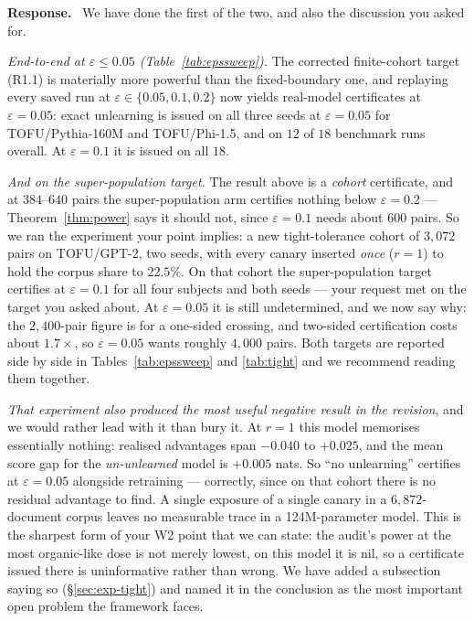 \documentclass[11pt,a4paper]{article}
\newcommand{\eps}{\varepsilon}
\newenvironment{reply}{%
  \par\smallskip\noindent\textbf{\color{acol}Response.}\ \begingroup}{\endgroup\par}
\begin{document}
\begin{reply}
We have done the first of the two, and also the discussion you asked for.

\emph{End-to-end at $\eps \le 0.05$ (Table~\ref{tab:epssweep}).} The corrected finite-cohort target
(R1.1) is materially more powerful than the fixed-boundary one, and replaying every
saved run at $\eps \in \{0.05, 0.1, 0.2\}$ now yields real-model certificates at
$\eps = 0.05$: exact unlearning is issued on all three seeds at $\eps=0.05$ for
TOFU/Pythia-160M and TOFU/Phi-1.5, and on $12$ of $18$ benchmark runs overall. At
$\eps = 0.1$ it is issued on all $18$.

\emph{And on the super-population target.} The result above is a \emph{cohort}
certificate, and at $384$--$640$ pairs the super-population arm certifies nothing below
$\eps = 0.2$ --- Theorem~\ref{thm:power} says it should not, since $\eps = 0.1$ needs about $600$
pairs. So we ran the experiment your point implies: a new tight-tolerance cohort of
$3{,}072$ pairs on TOFU/GPT-2, two seeds, with every canary inserted \emph{once}
($r = 1$) to hold the corpus share to $22.5\%$. On that cohort the super-population
target certifies at $\eps = 0.1$ for all four subjects and both seeds --- your request
met on the target you asked about. At $\eps = 0.05$ it is still undetermined, and we
now say why: the $2{,}400$-pair figure is for a one-sided crossing, and two-sided
certification costs about $1.7\times$, so $\eps = 0.05$ wants roughly $4{,}000$ pairs.
Both targets are reported side by side in Tables~\ref{tab:epssweep} and \ref{tab:tight} and we recommend reading them
together.

\emph{That experiment also produced the most useful negative result in the revision},
and we would rather lead with it than bury it. At $r = 1$ this model memorises
essentially nothing: realised advantages span $-0.040$ to $+0.025$, and the mean score
gap for the \emph{un-unlearned} model is $+0.005$ nats. So ``no unlearning'' certifies
at $\eps = 0.05$ alongside retraining --- correctly, since on that cohort there is no
residual advantage to find. A single exposure of a single canary in a
$6{,}872$-document corpus leaves no measurable trace in a 124M-parameter model. This is
the sharpest form of your W2 point that we can state: the audit's power at the
most organic-like dose is not merely lowest, on this model it is nil, so a certificate
issued there is uninformative rather than wrong. We have added a subsection saying so
(\S\ref{sec:exp-tight}) and named it in the conclusion as the most important open problem the
framework faces.


\end{reply}
\end{document}

